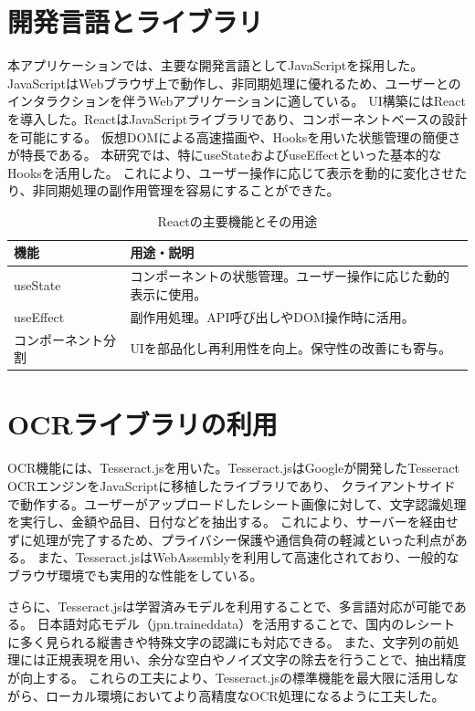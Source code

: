 \documentclass[main]{subfiles}
\begin{document}
\section{開発言語とライブラリ}

本アプリケーションでは、主要な開発言語としてJavaScriptを採用した。
JavaScriptはWebブラウザ上で動作し、非同期処理に優れるため、ユーザーとのインタラクションを伴うWebアプリケーションに適している。
UI構築にはReactを導入した。ReactはJavaScriptライブラリであり、コンポーネントベースの設計を可能にする。
仮想DOMによる高速描画や、Hooksを用いた状態管理の簡便さが特長である。
本研究では、特にuseStateおよびuseEffectといった基本的なHooksを活用した。
これにより、ユーザー操作に応じて表示を動的に変化させたり、非同期処理の副作用管理を容易にすることができた。

\begin{table}[htbp]
\centering
\caption{Reactの主要機能とその用途}
\label{tab:react_features}
\begin{tabular}{lp{9cm}}
\hline
\textbf{機能} & \textbf{用途・説明} \\
\hline
useState & コンポーネントの状態管理。ユーザー操作に応じた動的表示に使用。 \\
useEffect & 副作用処理。API呼び出しやDOM操作時に活用。 \\
コンポーネント分割 & UIを部品化し再利用性を向上。保守性の改善にも寄与。 \\
\hline
\end{tabular}
\end{table}

\section{OCRライブラリの利用}

OCR機能には、Tesseract.jsを用いた。Tesseract.jsはGoogleが開発したTesseract OCRエンジンをJavaScriptに移植したライブラリであり、
クライアントサイドで動作する。ユーザーがアップロードしたレシート画像に対して、文字認識処理を実行し、金額や品目、日付などを抽出する。
これにより、サーバーを経由せずに処理が完了するため、プライバシー保護や通信負荷の軽減といった利点がある。
また、Tesseract.jsはWebAssemblyを利用して高速化されており、一般的なブラウザ環境でも実用的な性能をしている。

さらに、Tesseract.jsは学習済みモデルを利用することで、多言語対応が可能である。
日本語対応モデル（jpn.traineddata）を活用することで、国内のレシートに多く見られる縦書きや特殊文字の認識にも対応できる。
また、文字列の前処理には正規表現を用い、余分な空白やノイズ文字の除去を行うことで、抽出精度が向上する。
これらの工夫により、Tesseract.jsの標準機能を最大限に活用しながら、ローカル環境においてより高精度なOCR処理になるように工夫した。
\end{document}
